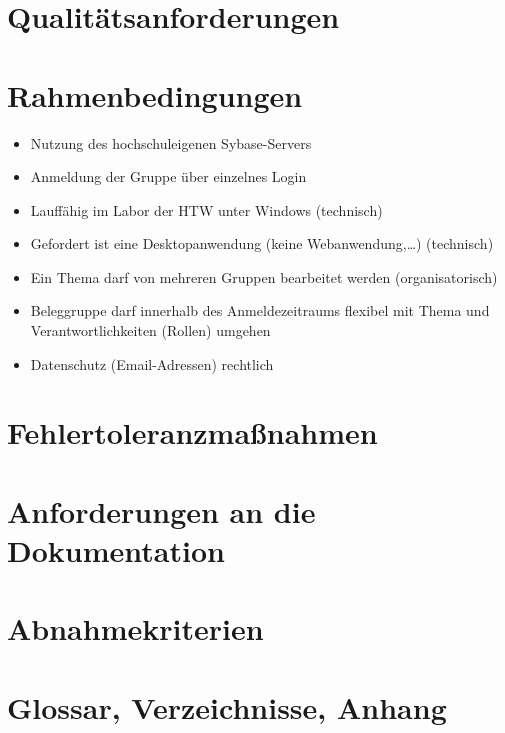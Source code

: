 \part{Qualitätsanforderungen}


\part{Rahmenbedingungen}
\begin{itemize}
\item Nutzung des hochschuleigenen Sybase-Servers
\item Anmeldung der Gruppe über einzelnes Login
\item Lauffähig im Labor der HTW unter Windows (technisch)
\item Gefordert ist eine Desktopanwendung (keine Webanwendung,…) (technisch)
\item Ein Thema darf von mehreren Gruppen bearbeitet werden (organisatorisch)
\item Beleggruppe darf innerhalb des Anmeldezeitraums flexibel mit Thema und Verantwortlichkeiten (Rollen) umgehen
\item Datenschutz (Email-Adressen) rechtlich
\end{itemize}

\part{Fehlertoleranzmaßnahmen}


\part{Anforderungen an die Dokumentation}


\part{Abnahmekriterien}


\part{Glossar, Verzeichnisse, Anhang}


